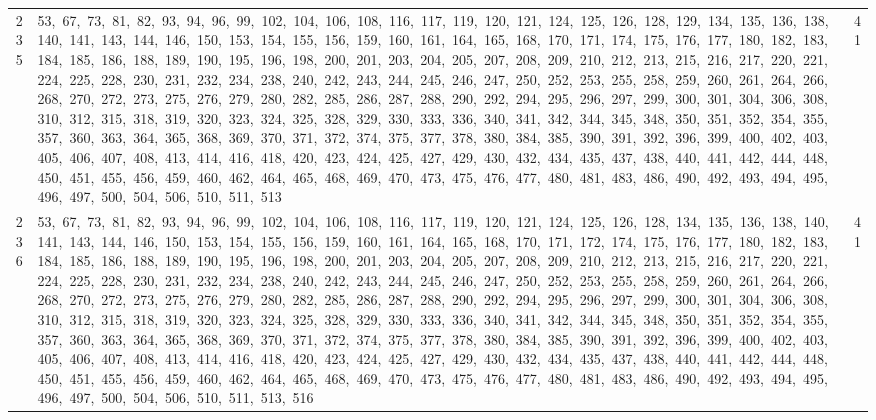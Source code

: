 \begin{longtable}{c|p{}|r}
235 & 53,\ 67,\ 73,\ 81,\ 82,\ 93,\ 94,\ 96,\ 99,\ 102,\ 104,\ 106,\ 108,\ 116,\ 117,\ 119,\ 120,\ 121,\ 124,\ 125,\ 126,\ 128,\ 129,\ 134,\ 135,\ 136,\ 138,\ 140,\ 141,\ 143,\ 144,\ 146,\ 150,\ 153,\ 154,\ 155,\ 156,\ 159,\ 160,\ 161,\ 164,\ 165,\ 168,\ 170,\ 171,\ 174,\ 175,\ 176,\ 177,\ 180,\ 182,\ 183,\ 184,\ 185,\ 186,\ 188,\ 189,\ 190,\ 195,\ 196,\ 198,\ 200,\ 201,\ 203,\ 204,\ 205,\ 207,\ 208,\ 209,\ 210,\ 212,\ 213,\ 215,\ 216,\ 217,\ 220,\ 221,\ 224,\ 225,\ 228,\ 230,\ 231,\ 232,\ 234,\ 238,\ 240,\ 242,\ 243,\ 244,\ 245,\ 246,\ 247,\ 250,\ 252,\ 253,\ 255,\ 258,\ 259,\ 260,\ 261,\ 264,\ 266,\ 268,\ 270,\ 272,\ 273,\ 275,\ 276,\ 279,\ 280,\ 282,\ 285,\ 286,\ 287,\ 288,\ 290,\ 292,\ 294,\ 295,\ 296,\ 297,\ 299,\ 300,\ 301,\ 304,\ 306,\ 308,\ 310,\ 312,\ 315,\ 318,\ 319,\ 320,\ 323,\ 324,\ 325,\ 328,\ 329,\ 330,\ 333,\ 336,\ 340,\ 341,\ 342,\ 344,\ 345,\ 348,\ 350,\ 351,\ 352,\ 354,\ 355,\ 357,\ 360,\ 363,\ 364,\ 365,\ 368,\ 369,\ 370,\ 371,\ 372,\ 374,\ 375,\ 377,\ 378,\ 380,\ 384,\ 385,\ 390,\ 391,\ 392,\ 396,\ 399,\ 400,\ 402,\ 403,\ 405,\ 406,\ 407,\ 408,\ 413,\ 414,\ 416,\ 418,\ 420,\ 423,\ 424,\ 425,\ 427,\ 429,\ 430,\ 432,\ 434,\ 435,\ 437,\ 438,\ 440,\ 441,\ 442,\ 444,\ 448,\ 450,\ 451,\ 455,\ 456,\ 459,\ 460,\ 462,\ 464,\ 465,\ 468,\ 469,\ 470,\ 473,\ 475,\ 476,\ 477,\ 480,\ 481,\ 483,\ 486,\ 490,\ 492,\ 493,\ 494,\ 495,\ 496,\ 497,\ 500,\ 504,\ 506,\ 510,\ 511,\ 513 & 41 \\
236 & 53,\ 67,\ 73,\ 81,\ 82,\ 93,\ 94,\ 96,\ 99,\ 102,\ 104,\ 106,\ 108,\ 116,\ 117,\ 119,\ 120,\ 121,\ 124,\ 125,\ 126,\ 128,\ 134,\ 135,\ 136,\ 138,\ 140,\ 141,\ 143,\ 144,\ 146,\ 150,\ 153,\ 154,\ 155,\ 156,\ 159,\ 160,\ 161,\ 164,\ 165,\ 168,\ 170,\ 171,\ 172,\ 174,\ 175,\ 176,\ 177,\ 180,\ 182,\ 183,\ 184,\ 185,\ 186,\ 188,\ 189,\ 190,\ 195,\ 196,\ 198,\ 200,\ 201,\ 203,\ 204,\ 205,\ 207,\ 208,\ 209,\ 210,\ 212,\ 213,\ 215,\ 216,\ 217,\ 220,\ 221,\ 224,\ 225,\ 228,\ 230,\ 231,\ 232,\ 234,\ 238,\ 240,\ 242,\ 243,\ 244,\ 245,\ 246,\ 247,\ 250,\ 252,\ 253,\ 255,\ 258,\ 259,\ 260,\ 261,\ 264,\ 266,\ 268,\ 270,\ 272,\ 273,\ 275,\ 276,\ 279,\ 280,\ 282,\ 285,\ 286,\ 287,\ 288,\ 290,\ 292,\ 294,\ 295,\ 296,\ 297,\ 299,\ 300,\ 301,\ 304,\ 306,\ 308,\ 310,\ 312,\ 315,\ 318,\ 319,\ 320,\ 323,\ 324,\ 325,\ 328,\ 329,\ 330,\ 333,\ 336,\ 340,\ 341,\ 342,\ 344,\ 345,\ 348,\ 350,\ 351,\ 352,\ 354,\ 355,\ 357,\ 360,\ 363,\ 364,\ 365,\ 368,\ 369,\ 370,\ 371,\ 372,\ 374,\ 375,\ 377,\ 378,\ 380,\ 384,\ 385,\ 390,\ 391,\ 392,\ 396,\ 399,\ 400,\ 402,\ 403,\ 405,\ 406,\ 407,\ 408,\ 413,\ 414,\ 416,\ 418,\ 420,\ 423,\ 424,\ 425,\ 427,\ 429,\ 430,\ 432,\ 434,\ 435,\ 437,\ 438,\ 440,\ 441,\ 442,\ 444,\ 448,\ 450,\ 451,\ 455,\ 456,\ 459,\ 460,\ 462,\ 464,\ 465,\ 468,\ 469,\ 470,\ 473,\ 475,\ 476,\ 477,\ 480,\ 481,\ 483,\ 486,\ 490,\ 492,\ 493,\ 494,\ 495,\ 496,\ 497,\ 500,\ 504,\ 506,\ 510,\ 511,\ 513,\ 516 & 41 \\

\end{longtable}
